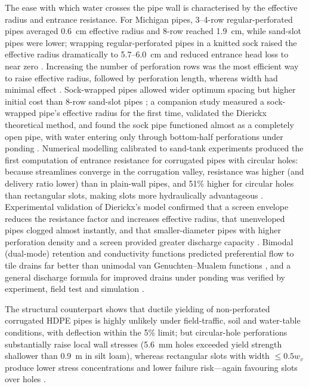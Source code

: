 \documentclass[11pt]{article}
\begin{document}
The ease with which water crosses the pipe wall is characterised by the effective radius and entrance resistance. For Michigan pipes, 3--4-row regular-perforated pipes averaged 0.6~cm effective radius and 8-row reached 1.9~cm, while sand-slot pipes were lower; wrapping regular-perforated pipes in a knitted sock raised the effective radius dramatically to 5.7--6.0~cm and reduced entrance head loss to near zero \parencite{Ghane2022b}. Increasing the number of perforation rows was the most efficient way to raise effective radius, followed by perforation length, whereas width had minimal effect \parencite{Ghane2022b}. Sock-wrapped pipes allowed wider optimum spacing but higher initial cost than 8-row sand-slot pipes \parencite{Ghane2022b}; a companion study measured a sock-wrapped pipe's effective radius for the first time, validated the Dierickx theoretical method, and found the sock pipe functioned almost as a completely open pipe, with water entering only through bottom-half perforations under ponding \parencite{Ghane2022}. Numerical modelling calibrated to sand-tank experiments produced the first computation of entrance resistance for corrugated pipes with circular holes: because streamlines converge in the corrugation valley, resistance was higher (and delivery ratio lower) than in plain-wall pipes, and 51\% higher for circular holes than rectangular slots, making slots more hydraulically advantageous \parencite{Gaj2020}. Experimental validation of Dierickx's model confirmed that a screen envelope reduces the resistance factor and increases effective radius, that unenveloped pipes clogged almost instantly, and that smaller-diameter pipes with higher perforation density and a screen provided greater discharge capacity \parencite{Oyarce2017}. Bimodal (dual-mode) retention and conductivity functions predicted preferential flow to tile drains far better than unimodal van Genuchten--Mualem functions \parencite{Mohanty1997}, and a general discharge formula for improved drains under ponding was verified by experiment, field test and simulation \parencite{Tao2019}.

The structural counterpart shows that ductile yielding of non-perforated corrugated HDPE pipes is highly unlikely under field-traffic, soil and water-table conditions, with deflection within the 5\% limit; but circular-hole perforations substantially raise local wall stresses (5.6~mm holes exceeded yield strength shallower than 0.9~m in silt loam), whereas rectangular slots with width $\le 0.5w_v$ produce lower stress concentrations and lower failure risk---again favouring slots over holes \parencite{Gaj2021}.
\end{document}
